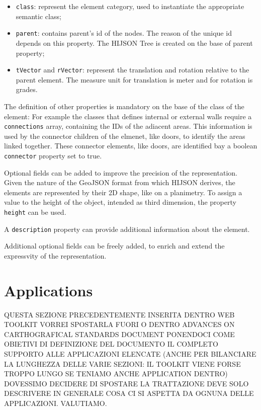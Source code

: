 \documentclass[]{article}
\begin{document}
\begin{itemize}
\itemsep1pt\parskip0pt
\item
  \texttt{class}: represent the element category, used to instantiate
  the appropriate semantic class;
\item
  \texttt{parent}: contains parent's id of the nodes. The reason of the
  unique id depends on this property. The HIJSON Tree is created on the
  base of parent property;
\item
  \texttt{tVector} and \texttt{rVector}: represent the translation and
  rotation relative to the parent element. The measure unit for
  translation is meter and for rotation is grades.
\end{itemize}

The definition of other properties is mandatory on the base of the class
of the element: For example the classes that defines internal or
external walls require a \texttt{connections} array, containing the IDs
of the adiacent areas. This information is used by the connector
children of the elmenet, like doors, to identify the areas linked
together. These connector elements, like doors, are identified bay a
boolean \texttt{connector} property set to true.

Optional fields can be added to improve the precision of the
representation. Given the nature of the GeoJSON format from which HIJSON
derives, the elements are represented by their 2D shape, like on a
planimetry. To assign a value to the height of the object, intended as
third dimension, the property \texttt{height} can be used.

A \texttt{description} property can provide additional information about
the element.

Additional optional fields can be freely added, to enrich and extend the
expressvity of the representation.

\section{Applications}\label{applications}

QUESTA SEZIONE PRECEDENTEMENTE INSERITA DENTRO WEB TOOLKIT VORREI
SPOSTARLA FUORI O DENTRO ADVANCES ON CARTHOGRAFICAL STANDARDS DOCUMENT
PONENDOCI COME OBIETIVI DI DEFINIZIONE DEL DOCUMENTO IL COMPLETO
SUPPORTO ALLE APPLICAZIONI ELENCATE (ANCHE PER BILANCIARE LA LUNGHEZZA
DELLE VARIE SEZIONI: IL TOOLKIT VIENE FORSE TROPPO LUNGO SE TENIAMO
ANCHE APPLICATION DENTRO) DOVESSIMO DECIDERE DI SPOSTARE LA TRATTAZIONE
DEVE SOLO DESCRIVERE IN GENERALE COSA CI SI ASPETTA DA OGNUNA DELLE
APPLICAZIONI. VALUTIAMO.
\end{document}
